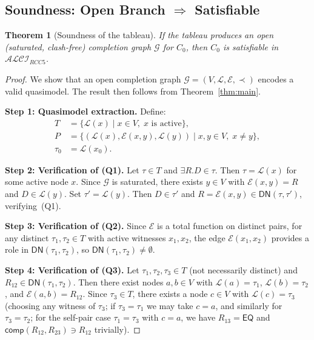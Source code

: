 \documentclass[a4paper,11pt]{article}
\newtheorem{theorem}{Theorem}[section]
\theoremstyle{definition}
\newcommand{\ALCIRCC}[1]{\ensuremath{\mathcal{ALCI}_{\mathit{RCC#1}}}}
\newcommand{\EQ}{\ensuremath{\mathsf{EQ}}}
\newcommand{\comp}{\ensuremath{\mathsf{comp}}}
\begin{document}
\subsection{Soundness: Open Branch $\Rightarrow$ Satisfiable}
\label{sec:tab-soundness}

\begin{theorem}[Soundness of the tableau]
\label{thm:tab-soundness}
If the tableau produces an open \textup{(}saturated, clash-free\textup{)}
completion graph $\mathcal{G}$ for $C_0$, then $C_0$ is satisfiable
in $\ALCIRCC{5}$.
\end{theorem}

\begin{proof}
We show that an open completion graph $\mathcal{G} = (V, \mathcal{L},
\mathcal{E}, \prec)$ encodes a valid quasimodel.  The result then
follows from Theorem~\ref{thm:main}.

\medskip\noindent\textbf{Step 1: Quasimodel extraction.}\; Define:
\begin{align*}
  T &= \{ \mathcal{L}(x) \mid x \in V,\; x \text{ is active} \}, \\
  P &= \{ (\mathcal{L}(x), \mathcal{E}(x,y), \mathcal{L}(y))
    \mid x,y \in V,\; x \neq y \}, \\
  \tau_0 &= \mathcal{L}(x_0).
\end{align*}

\medskip\noindent\textbf{Step 2: Verification of (Q1).}\; Let $\tau
\in T$ and $\exists R.D \in \tau$.  Then $\tau = \mathcal{L}(x)$ for
some active node $x$.  Since $\mathcal{G}$ is saturated, there exists
$y \in V$ with $\mathcal{E}(x,y) = R$ and $D \in \mathcal{L}(y)$.
Set $\tau' = \mathcal{L}(y)$.  Then $D \in \tau'$ and
$R = \mathcal{E}(x,y) \in \mathsf{DN}(\tau, \tau')$, verifying~(Q1).

\medskip\noindent\textbf{Step 3: Verification of (Q2).}\; Since
$\mathcal{E}$ is a total function on distinct pairs, for any distinct
$\tau_1, \tau_2 \in T$ with active witnesses $x_1, x_2$, the edge
$\mathcal{E}(x_1, x_2)$ provides a role in
$\mathsf{DN}(\tau_1, \tau_2)$, so
$\mathsf{DN}(\tau_1, \tau_2) \neq \emptyset$.

\medskip\noindent\textbf{Step 4: Verification of (Q3).}\;
Let $\tau_1, \tau_2, \tau_3 \in T$ (not necessarily distinct) and
$R_{12} \in \mathsf{DN}(\tau_1, \tau_2)$.  Then there exist nodes
$a, b \in V$ with $\mathcal{L}(a) = \tau_1$, $\mathcal{L}(b) =
\tau_2$, and $\mathcal{E}(a,b) = R_{12}$.  Since $\tau_3 \in T$,
there exists a node $c \in V$ with $\mathcal{L}(c) = \tau_3$
(choosing any witness of $\tau_3$; if $\tau_3 = \tau_1$ we may take
$c = a$, and similarly for $\tau_3 = \tau_2$; for the self-pair case
$\tau_1 = \tau_3$ with $c = a$, we have $R_{13} = \EQ$ and
$\comp(R_{12}, R_{23}) \ni R_{12}$ trivially).


\end{proof}
\end{document}
